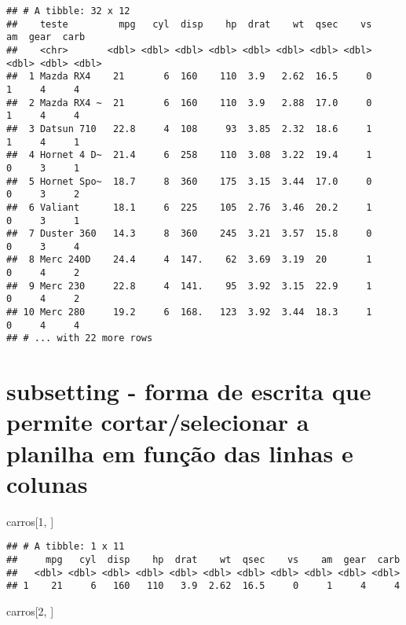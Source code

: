 \documentclass[]{book}
\newenvironment{Shaded}{\begin{snugshade}}{\end{snugshade}}
\newcommand{\DecValTok}[1]{\textcolor[rgb]{0.00,0.00,0.81}{#1}}
\newcommand{\NormalTok}[1]{#1}
\begin{document}
\begin{verbatim}
## # A tibble: 32 x 12
##    teste         mpg   cyl  disp    hp  drat    wt  qsec    vs    am  gear  carb
##    <chr>       <dbl> <dbl> <dbl> <dbl> <dbl> <dbl> <dbl> <dbl> <dbl> <dbl> <dbl>
##  1 Mazda RX4    21       6  160    110  3.9   2.62  16.5     0     1     4     4
##  2 Mazda RX4 ~  21       6  160    110  3.9   2.88  17.0     0     1     4     4
##  3 Datsun 710   22.8     4  108     93  3.85  2.32  18.6     1     1     4     1
##  4 Hornet 4 D~  21.4     6  258    110  3.08  3.22  19.4     1     0     3     1
##  5 Hornet Spo~  18.7     8  360    175  3.15  3.44  17.0     0     0     3     2
##  6 Valiant      18.1     6  225    105  2.76  3.46  20.2     1     0     3     1
##  7 Duster 360   14.3     8  360    245  3.21  3.57  15.8     0     0     3     4
##  8 Merc 240D    24.4     4  147.    62  3.69  3.19  20       1     0     4     2
##  9 Merc 230     22.8     4  141.    95  3.92  3.15  22.9     1     0     4     2
## 10 Merc 280     19.2     6  168.   123  3.92  3.44  18.3     1     0     4     4
## # ... with 22 more rows
\end{verbatim}

\hypertarget{subsetting---forma-de-escrita-que-permite-cortarselecionar-a-planilha-em-funuxe7uxe3o-das-linhas-e-colunas}{%
\section{subsetting - forma de escrita que permite cortar/selecionar a planilha em função das linhas e colunas}\label{subsetting---forma-de-escrita-que-permite-cortarselecionar-a-planilha-em-funuxe7uxe3o-das-linhas-e-colunas}}

\begin{Shaded}
\begin{Highlighting}[]
\NormalTok{carros[}\DecValTok{1}\NormalTok{, ]}
\end{Highlighting}
\end{Shaded}

\begin{verbatim}
## # A tibble: 1 x 11
##     mpg   cyl  disp    hp  drat    wt  qsec    vs    am  gear  carb
##   <dbl> <dbl> <dbl> <dbl> <dbl> <dbl> <dbl> <dbl> <dbl> <dbl> <dbl>
## 1    21     6   160   110   3.9  2.62  16.5     0     1     4     4
\end{verbatim}

\begin{Shaded}
\begin{Highlighting}[]
\NormalTok{carros[}\DecValTok{2}\NormalTok{, ]}
\end{Highlighting}
\end{Shaded}
\end{document}
